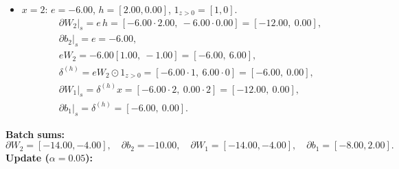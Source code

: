 \documentclass[11pt]{article}
\begin{document}
\begin{itemize}
\begin{align*}
&\partial b_2\big|_s = e = -2.00,\\
&eW_2 = -2.00[1.00,\ -1.00] = [-2.00,\ 2.00],\\
&\delta^{(h)} = eW_2 \odot 1_{z>0} = [-2.00\cdot1,\ 2.00\cdot0] = [-2.00,\ 0.00],\\
&\partial W_1\big|_s = \delta^{(h)} x = [-2.00\cdot1,\ 0.00\cdot1] = [-2.00,\ 0.00],\\
&\partial b_1\big|_s = \delta^{(h)} = [-2.00,\ 0.00].
\end{align*}
\item $x=2$: $e=-6.00$, $h=[2.00, 0.00]$, $1_{z>0}=[1,0]$.
\begin{align*}
&\partial W_2\big|_s = e\,h = [-6.00\cdot2.00,\ -6.00\cdot0.00] = [-12.00,\ 0.00],\\
&\partial b_2\big|_s = e = -6.00,\\
&eW_2 = -6.00[1.00,\ -1.00] = [-6.00,\ 6.00],\\
&\delta^{(h)} = eW_2 \odot 1_{z>0} = [-6.00\cdot1,\ 6.00\cdot0] = [-6.00,\ 0.00],\\
&\partial W_1\big|_s = \delta^{(h)} x = [-6.00\cdot2,\ 0.00\cdot2] = [-12.00,\ 0.00],\\
&\partial b_1\big|_s = \delta^{(h)} = [-6.00,\ 0.00].
\end{align*}
\end{itemize}
\noindent\textbf{Batch sums:}
\[
\partial W_2=[-14.00, -4.00],\quad \partial b_2=-10.00,\quad \partial W_1=[-14.00, -4.00],\quad \partial b_1=[-8.00, 2.00].
\]
\noindent\textbf{Update ($\alpha=0.05$):}
\end{document}
